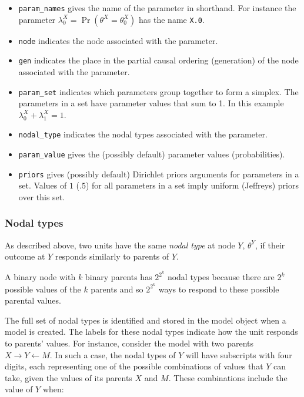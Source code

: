 \documentclass[
  11pt,
  article]{jss}
\providecommand{\tightlist}{%
  \setlength{\itemsep}{0pt}\setlength{\parskip}{0pt}}\usepackage{longtable,booktabs,array}
\begin{document}
\begin{itemize}
\tightlist
\item
  \texttt{param\_names} gives the name of the parameter in shorthand.
  For instance the parameter
  \(\lambda^X_0 = \Pr(\theta^X = \theta^X_0)\) has the name
  \texttt{X.0}.
\item
  \texttt{node} indicates the node associated with the parameter.
\item
  \texttt{gen} indicates the place in the partial causal ordering
  (generation) of the node associated with the parameter.
\item
  \texttt{param\_set} indicates which parameters group together to form
  a simplex. The parameters in a set have parameter values that sum to
  1. In this example \(\lambda^X_0 + \lambda^X_1 = 1\).
\item
  \texttt{nodal\_type} indicates the nodal types associated with the
  parameter.
\item
  \texttt{param\_value} gives the (possibly default) parameter values
  (probabilities).
\item
  \texttt{priors} gives (possibly default) Dirichlet priors arguments
  for parameters in a set. Values of \(1\) (\(.5\)) for all parameters
  in a set imply uniform (Jeffreys) priors over this set.
\end{itemize}

\subsubsection{Nodal types}\label{sec-nodal-types}

As described above, two units have the same \emph{nodal type} at node
\(Y\), \(\theta^Y\), if their outcome at \(Y\) responds similarly to
parents of \(Y\).

A binary node with \(k\) binary parents has \(2^{2^k}\) nodal types
because there are \(2^k\) possible values of the \(k\) parents and so
\(2^{2^k}\) ways to respond to these possible parental values.

The full set of nodal types is identified and stored in the model object
when a model is created. The labels for these nodal types indicate how
the unit responds to parents' values. For instance, consider the model
with two parents \(X \rightarrow Y \leftarrow M.\) In such a case, the
nodal types of \(Y\) will have subscripts with four digits, each
representing one of the possible combinations of values that \(Y\) can
take, given the values of its parents \(X\) and \(M.\) These
combinations include the value of \(Y\) when:
\end{document}
